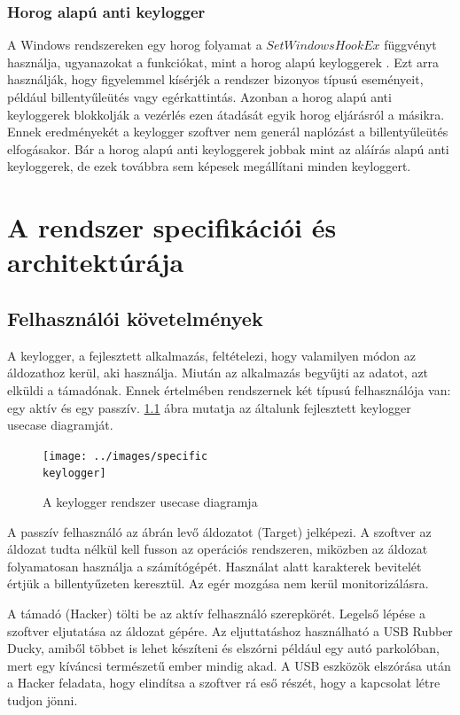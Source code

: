 \documentclass[12pt,a4paper,oneside]{report}
\begin{document}
\subsection{Horog alapú anti keylogger}
A Windows rendszereken egy horog folyamat a $SetWindowsHookEx$ függvényt használja, ugyanazokat a funkciókat, mint a horog alapú keyloggerek \cite{tuli2013system}. Ezt arra használják, hogy figyelemmel kísérjék a rendszer bizonyos típusú eseményeit, például billentyűleütés vagy egérkattintás. Azonban a horog alapú anti keyloggerek blokkolják a vezérlés ezen átadását egyik horog eljárásról a másikra. Ennek eredményekét a keylogger szoftver nem generál naplózást a billentyűleütés elfogásakor. Bár a horog alapú anti keyloggerek jobbak mint az aláírás alapú anti keyloggerek, de ezek továbbra sem képesek megállítani minden keyloggert.


\chapter{A rendszer specifikációi és architektúrája}\label{sec:specs_and_arch}

\section{Felhasználói követelmények}
A keylogger, a fejlesztett alkalmazás, feltételezi, hogy valamilyen módon az áldozathoz kerül, aki használja. Miután az alkalmazás begyűjti az adatot, azt elküldi a támadónak. Ennek értelmében rendszernek két típusú felhasználója van: egy aktív és egy passzív. \ref{fig:specifickeylogger} ábra mutatja az általunk fejlesztett keylogger usecase diagramját.
\begin{figure}[H]
\centering
\texttt{[image: ../images/specific\\ keylogger]}
\caption{A keylogger rendszer usecase diagramja}
\label{fig:specifickeylogger}
\end{figure}

A passzív felhasználó az ábrán levő áldozatot (Target) jelképezi. A szoftver az áldozat tudta nélkül kell fusson az operációs rendszeren, miközben az áldozat folyamatosan használja a számítógépét. Használat alatt karakterek bevitelét értjük a billentyűzeten keresztül. Az egér mozgása nem kerül monitorizálásra.

A támadó (Hacker) tölti be az aktív felhasználó szerepkörét. Legelső lépése a szoftver eljutatása az áldozat gépére. Az eljuttatáshoz használható a USB Rubber Ducky, amiből többet is lehet készíteni és elszórni például egy autó parkolóban, mert egy kíváncsi természetű ember mindig akad. A USB eszközök elszórása után a Hacker feladata, hogy elindítsa a szoftver rá eső részét, hogy a kapcsolat létre tudjon jönni.
\end{document}
